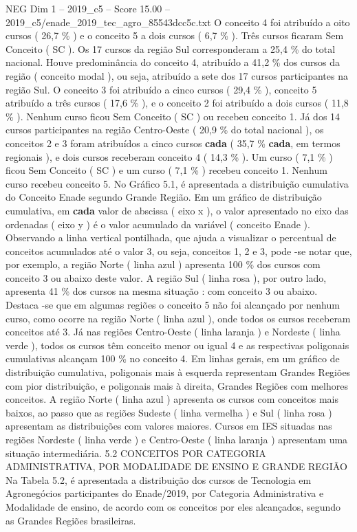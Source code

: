 \begin{textsample}{NEG Dim 1 – 2019\_c5 – Score 15.00 – 2019\_c5/enade\_2019\_tec\_agro\_85543dcc5c.txt}
O conceito 4 foi atribuído a oito cursos ( 26,7 \% ) e o conceito 5 a dois cursos ( 6,7 \% ).
Três cursos ficaram Sem Conceito ( SC ).
Os 17 cursos da região Sul corresponderam a 25,4 \% do total nacional.
Houve predominância do conceito 4, atribuído a 41,2 \% dos cursos da região ( conceito modal ), ou seja, atribuído a sete dos 17 cursos participantes na região Sul.
O conceito 3 foi atribuído a cinco cursos ( 29,4 \% ), conceito 5 atribuído a três cursos ( 17,6 \% ), e o conceito 2 foi atribuído a dois cursos ( 11,8 \% ).
Nenhum curso ficou Sem Conceito ( SC ) ou recebeu conceito 1.
Já dos 14 cursos participantes na região Centro-Oeste ( 20,9 \% do total nacional ), os conceitos 2 e 3 foram atribuídos a cinco cursos \textbf{cada} ( 35,7 \% \textbf{cada}, em termos regionais ), e dois cursos receberam conceito 4 ( 14,3 \% ).
Um curso ( 7,1 \% ) ficou Sem Conceito ( SC ) e um curso ( 7,1 \% ) recebeu conceito 1.
Nenhum curso recebeu conceito 5.
No Gráfico 5.1, é apresentada a distribuição cumulativa do Conceito Enade segundo Grande Região.
Em um gráfico de distribuição cumulativa, em \textbf{cada} valor de abscissa ( eixo x ), o valor apresentado no eixo das ordenadas ( eixo y ) é o valor acumulado da variável ( conceito Enade ).
Observando a linha vertical pontilhada, que ajuda a visualizar o percentual de conceitos acumulados até o valor 3, ou seja, conceitos 1, 2 e 3, pode -se notar que, por exemplo, a região Norte ( linha azul ) apresenta 100 \% dos cursos com conceito 3 ou abaixo deste valor.
A região Sul ( linha rosa ), por outro lado, apresenta 41 \% dos cursos na mesma situação : com conceito 3 ou abaixo.
Destaca -se que em algumas regiões o conceito 5 não foi alcançado por nenhum curso, como ocorre na região Norte ( linha azul ), onde todos os cursos receberam conceitos até 3.
Já nas regiões Centro-Oeste ( linha laranja ) e Nordeste ( linha verde ), todos os cursos têm conceito menor ou igual 4 e as respectivas poligonais cumulativas alcançam 100 \% no conceito 4.
Em linhas gerais, em um gráfico de distribuição cumulativa, poligonais mais à esquerda representam Grandes Regiões com pior distribuição, e poligonais mais à direita, Grandes Regiões com melhores conceitos.
A região Norte ( linha azul ) apresenta os cursos com conceitos mais baixos, ao passo que as regiões Sudeste ( linha vermelha ) e Sul ( linha rosa ) apresentam as distribuições com valores maiores.
Cursos em IES situadas nas regiões Nordeste ( linha verde ) e Centro-Oeste ( linha laranja ) apresentam uma situação intermediária. 5.2 CONCEITOS POR CATEGORIA ADMINISTRATIVA, POR MODALIDADE DE ENSINO E GRANDE REGIÃO Na Tabela 5.2, é apresentada a distribuição dos cursos de Tecnologia em Agronegócios participantes do Enade/2019, por Categoria Administrativa e Modalidade de ensino, de acordo com os conceitos por eles alcançados, segundo as Grandes Regiões brasileiras.

\end{textsample}
